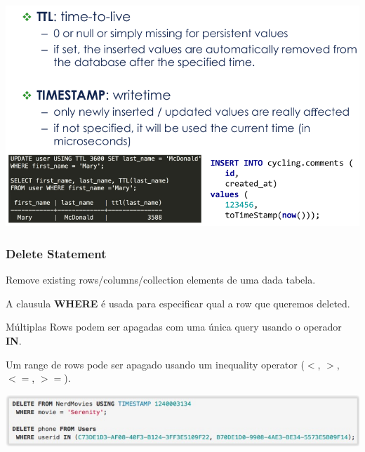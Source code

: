 \documentclass{article}
\begin{document}
\begin{center}
  \includegraphics[scale=0.25]{39}
\end{center}

\subsubsection{Delete Statement}

\begin{flushleft}
  Remove existing rows/columns/collection elements de uma dada tabela.

  A clausula \textbf{WHERE} é usada para especificar qual a row que queremos deleted.

  Múltiplas Rows podem ser apagadas com uma única query usando o operador \textbf{IN}.

  Um range de rows pode ser apagado usando um inequality operator ($<$, $>$, $<=$, $>=$).

  \begin{center}
    \includegraphics[scale=0.3]{40}
  \end{center}
\end{flushleft}
\end{document}
